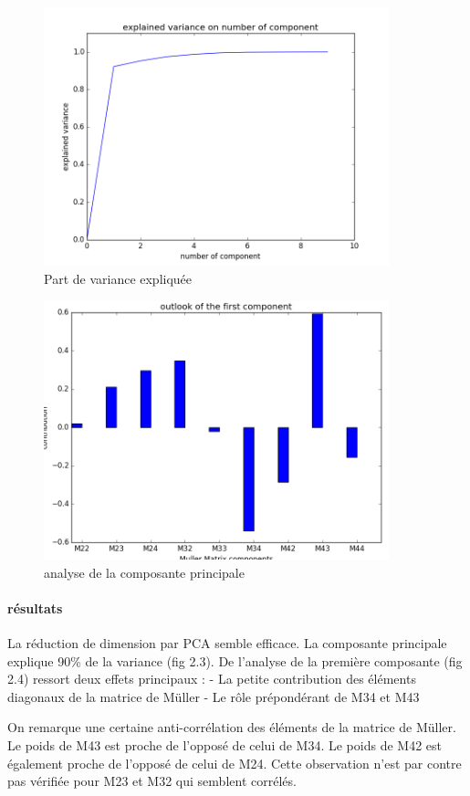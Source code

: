 \documentclass[a4paper,10pt]{report}
\begin{document}
\begin{figure}[htbp]
  \caption{Part de variance expliquée}
  \centering
  \includegraphics[width=10cm]{PCA_3.png}
\end{figure}
\begin{figure}[htbp]
  \caption{analyse de la composante principale}
  \centering
  \includegraphics[width=10cm]{PCA_2.png}
\end{figure}

\paragraph{résultats}
La réduction de dimension par PCA semble efficace. La composante principale explique 90\% de la variance (fig 2.3). 
De l'analyse de la première composante (fig 2.4) ressort deux effets principaux :
- La petite contribution des éléments diagonaux de la matrice de Müller
- Le rôle prépondérant de M34 et M43

On remarque une certaine anti-corrélation des éléments de la matrice de Müller. Le poids de M43 est proche de l'opposé de celui de M34. Le poids de M42 est également proche de l'opposé de celui de M24. Cette observation n'est par contre pas vérifiée pour M23 et M32 qui semblent corrélés.
\end{document}

